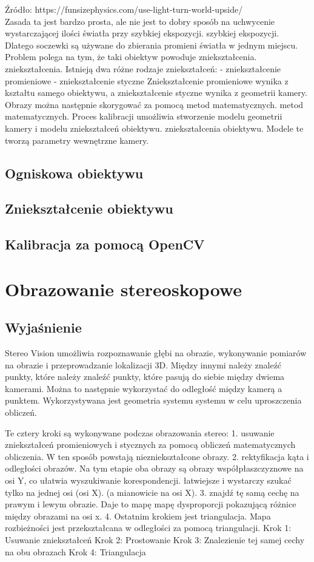 \documentclass[magisterska]{pracadypl}
\begin{document}
Źródło: https://funsizephysics.com/use-light-turn-world-upside/\\
Zasada ta jest bardzo prosta, ale nie jest to dobry sposób na uchwycenie wystarczającej ilości światła przy szybkiej ekspozycji.
szybkiej ekspozycji. Dlatego soczewki są używane do zbierania
promieni światła w jednym miejscu. Problem polega na tym, że taki obiektyw powoduje zniekształcenia.
zniekształcenia.
Istnieją dwa różne rodzaje zniekształceń:
- zniekształcenie promieniowe
- zniekształcenie styczne
Zniekształcenie promieniowe wynika z kształtu samego obiektywu, a zniekształcenie styczne
wynika z geometrii kamery. Obrazy można następnie skorygować za pomocą metod matematycznych.
metod matematycznych.
Proces kalibracji umożliwia stworzenie modelu geometrii kamery i modelu zniekształceń obiektywu.
zniekształcenia obiektywu. Modele te tworzą parametry wewnętrzne kamery.

\subsection{Ogniskowa obiektywu}
\subsection{Zniekształcenie obiektywu}
\subsection{Kalibracja za pomocą OpenCV}
\section{Obrazowanie stereoskopowe}
\subsection{Wyjaśnienie}

Stereo Vision umożliwia rozpoznawanie głębi na obrazie, wykonywanie pomiarów na obrazie
i przeprowadzanie lokalizacji 3D. Między innymi należy znaleźć punkty, które
należy znaleźć punkty, które pasują do siebie między dwiema kamerami. Można to następnie wykorzystać do
odległość między kamerą a punktem. Wykorzystywana jest geometria systemu
systemu w celu uproszczenia obliczeń.

Te cztery kroki są wykonywane podczas obrazowania stereo:
1. usuwanie zniekształceń promieniowych i stycznych za pomocą obliczeń matematycznych
obliczenia. W ten sposób powstają niezniekształcone obrazy.
2. rektyfikacja kąta i odległości obrazów. Na tym etapie oba obrazy są
obrazy współpłaszczyznowe na osi Y, co ułatwia wyszukiwanie korespondencji.
łatwiejsze i wystarczy szukać tylko na jednej osi (osi X).
(a mianowicie na osi X).
3. znajdź tę samą cechę na prawym i lewym obrazie. Daje to mapę
mapę dysproporcji pokazującą różnice między obrazami na osi x.
4. Ostatnim krokiem jest triangulacja. Mapa rozbieżności jest przekształcana w
odległości za pomocą triangulacji.
Krok 1: Usuwanie zniekształceń
Krok 2: Prostowanie
Krok 3: Znalezienie tej samej cechy na obu obrazach
Krok 4: Triangulacja
\end{document}
